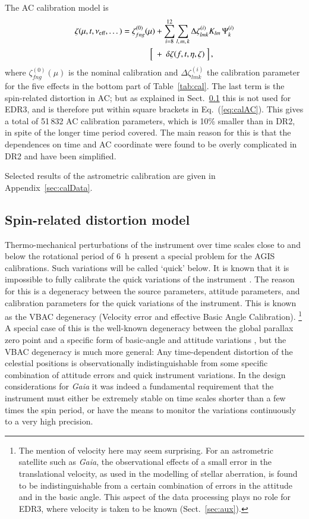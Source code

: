 \documentclass[longauth]{aa} %
\begin{document}
The AC calibration model is 
\begin{equation}\label{eq:calAC}
\begin{split}
\zeta(\mu,t,\nu_\text{eff},\dots) = \zeta_{fng}^{(0)}(\mu) 
&+ \sum_{i=8}^{12} \sum_{l,\,m,\,k} \Delta\zeta^{(i)}_{lmk} K_{lm}\,\Psi^{(i)}_k \\
\Bigl[~&+~\delta\zeta(f,t,\eta,\zeta)~\Bigr] \, ,
\end{split}
\end{equation}
where $\zeta^{(0)}_{fng}(\mu)$ is the nominal calibration and $\Delta\zeta^{(i)}_{lmk}$ 
the calibration parameter for the five effects in the bottom part of Table~\ref{tab:cal}.
The last term is the spin-related distortion in AC; but as explained in Sect.~\ref{sec:glob}
this is not used for EDR3, and is therefore put within square brackets in Eq.~(\ref{eq:calAC}).  
This gives a total of 51\,832 AC calibration parameters, which is 10\% smaller than 
in DR2, in spite of the longer time period covered. The main reason for this is that the 
dependences on time and AC coordinate were found to be overly complicated in DR2 
and have been simplified.

Selected results of the astrometric calibration are given in Appendix~\ref{sec:calData}.

\subsection{Spin-related distortion model}
\label{sec:glob}

Thermo-mechanical perturbations of the instrument over time
scales close to and below the rotational period of 6~h
present a special problem for the AGIS calibrations. Such variations
will be called `quick' below. It is known
that it is impossible to fully calibrate the quick variations of the
instrument . The reason for this is 
a degeneracy between the source parameters, attitude parameters, 
and calibration parameters for the quick variations of the instrument. 
This is known as the VBAC degeneracy (Velocity error and
effective Basic Angle Calibration).%
\footnote{The mention of velocity here may seem surprising. For an astrometric 
satellite such as \textit{Gaia}, the observational effects of a 
small error in the translational velocity, as used in the modelling of stellar aberration, 
is found to be indistinguishable from a certain combination of errors in the attitude and in the 
basic angle. This aspect of the data processing plays no role for EDR3, where velocity 
is taken to be known (Sect.~\ref{sec:aux}).} 
A special case of this is the well-known degeneracy between the global parallax zero 
point and a specific form of basic-angle and attitude variations ,
but the VBAC degeneracy is much more general: Any time-dependent distortion of 
the celestial positions is observationally indistinguishable from some specific 
combination of attitude errors and quick instrument variations. In the design 
considerations for \textit{Gaia} it was indeed a fundamental requirement that 
the instrument must either be extremely stable on time scales shorter than a few times 
the spin period, or have the means to monitor the variations continuously to a very high 
precision.
\end{document}
